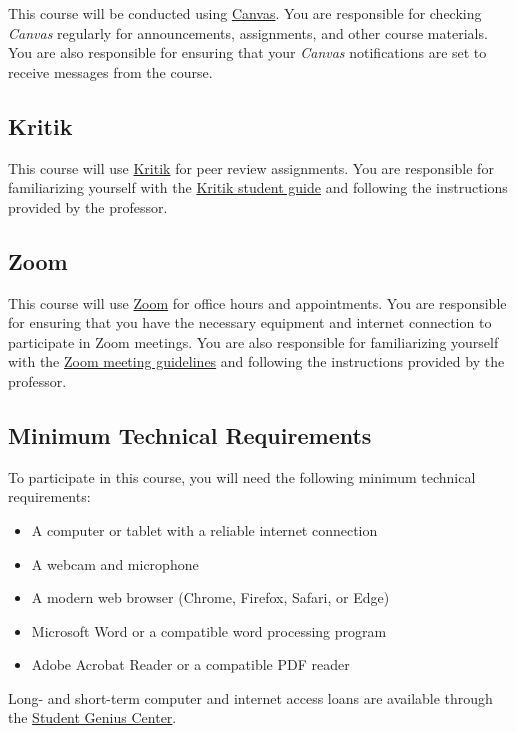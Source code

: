 \documentclass[11pt, letterpaper]{article}
\begin{document}
This course will be conducted using \href{https://csufullerton.instructure.com/}{Canvas}. You are responsible for checking \emph{Canvas} regularly for announcements, assignments, and other course materials. You are also responsible for ensuring that your \emph{Canvas} notifications are set to receive messages from the course. 

\subsection*{Kritik}

This course will use \href{https://kritik.io/}{Kritik} for peer review assignments. You are responsible for familiarizing yourself with the \href{https://help.kritik.io/en/collections/3549681-student-guide}{Kritik student guide} and following the instructions provided by the professor. 

\subsection*{Zoom}
This course will use \href{https://fullerton.zoom.us/}{Zoom} for office hours and appointments. You are responsible for ensuring that you have the necessary equipment and internet connection to participate in Zoom meetings. You are also responsible for familiarizing yourself with the \href{https://support.zoom.us/hc/en-us/articles/201362193-Joining-a-Meeting}{Zoom meeting guidelines} and following the instructions provided by the professor.

\subsection*{Minimum Technical Requirements}

To participate in this course, you will need the following minimum technical requirements:
\begin{itemize}
    \item A computer or tablet with a reliable internet connection
    \item A webcam and microphone
    \item A modern web browser (Chrome, Firefox, Safari, or Edge)
    \item Microsoft Word or a compatible word processing program
    \item Adobe Acrobat Reader or a compatible PDF reader
\end{itemize}

\noindent Long- and short-term computer and internet access loans are available through the \href{http://www.fullerton.edu/it/students/sgc/index.php}{Student Genius Center}.
\end{document}
